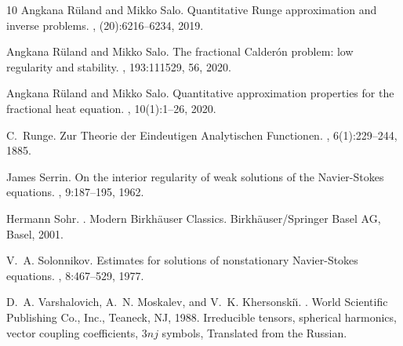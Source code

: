 \documentclass[11pt,a4paper]{article}
\numberwithin{equation}{section}
\begin{document}
\begin{thebibliography}{10}
Angkana R\"uland and Mikko Salo.
\newblock Quantitative {R}unge approximation and inverse problems.
, (20):6216--6234, 2019.

Angkana R\"uland and Mikko Salo.
\newblock The fractional {C}alder\'on problem: low regularity and stability.
, 193:111529, 56, 2020.

Angkana R\"uland and Mikko Salo.
\newblock Quantitative approximation properties for the fractional heat equation.
, 10(1):1--26, 2020.

C.~Runge.
\newblock Zur {T}heorie der {E}indeutigen {A}nalytischen {F}unctionen.
, 6(1):229--244, 1885.

James Serrin.
\newblock On the interior regularity of weak solutions of the {N}avier-{S}tokes equations.
, 9:187--195, 1962.

Hermann Sohr.
.
\newblock Modern Birkh\"{a}user Classics. Birkh\"{a}user/Springer Basel AG, Basel, 2001.

V.~A. Solonnikov.
\newblock Estimates for solutions of nonstationary {Navier}-{Stokes} equations.
, 8:467--529, 1977.

D.~A. Varshalovich, A.~N. Moskalev, and V.~K. Khersonski\u{\i}.
.
\newblock World Scientific Publishing Co., Inc., Teaneck, NJ, 1988.
\newblock Irreducible tensors, spherical harmonics, vector coupling coefficients, $3nj$ symbols, Translated from the Russian.

\end{thebibliography}
\end{document}
